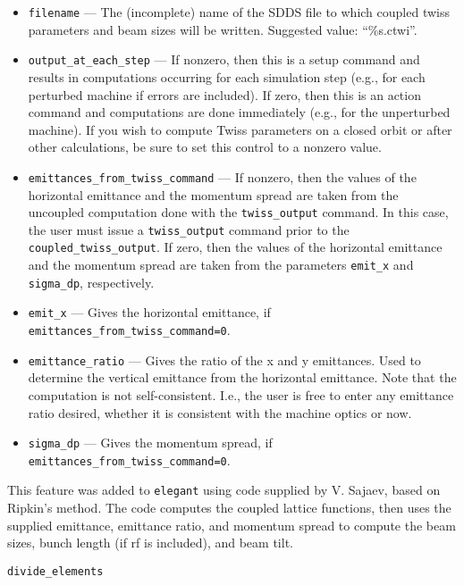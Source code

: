 \documentclass[11pt]{article}
\begin{document}
\begin{itemize}

\item \verb|filename| --- The (incomplete) name of the SDDS file to which coupled twiss parameters and
  beam sizes will be written.  Suggested value: ``\%s.ctwi''.
\item \verb|output_at_each_step| --- If nonzero, then this is a setup
  command and results in computations occurring for each simulation
  step (e.g., for each perturbed machine if errors are included).  If
  zero, then this is an action command and computations are done
  immediately (e.g., for the unperturbed machine). If you wish to compute Twiss parameters on a closed orbit or after other calculations,
  be sure to set this control to a nonzero value.
\item \verb|emittances_from_twiss_command| --- If nonzero, then the values of the horizontal emittance
  and the momentum spread are taken from the uncoupled computation done with the \verb|twiss_output| command.
  In this case, the user must issue a \verb|twiss_output| command prior to the \verb|coupled_twiss_output|.
  If zero, then the values of the horizontal emittance
  and the momentum spread are taken from the parameters \verb|emit_x| and \verb|sigma_dp|, respectively.
\item \verb|emit_x| --- Gives the horizontal emittance, if \verb|emittances_from_twiss_command=0|.
\item \verb|emittance_ratio| --- Gives the ratio of the x and y emittances.  Used to determine the
  vertical emittance from the horizontal emittance.  Note that the computation is not self-consistent.
  I.e., the user is free to enter any emittance ratio desired, whether it is consistent with the
  machine optics or now.
\item \verb|sigma_dp| ---  Gives the momentum spread, if \verb|emittances_from_twiss_command=0|.
\end{itemize}

This feature was added to {\tt elegant} using code supplied by V. Sajaev, based on Ripkin's method.
The code computes the coupled lattice functions, then uses the supplied emittance, emittance ratio,
and momentum spread to compute the beam sizes, bunch length (if rf is included), and beam tilt.

\newpage
\begin{center}{\Large\verb|divide_elements|}\end{center}
\end{document}
